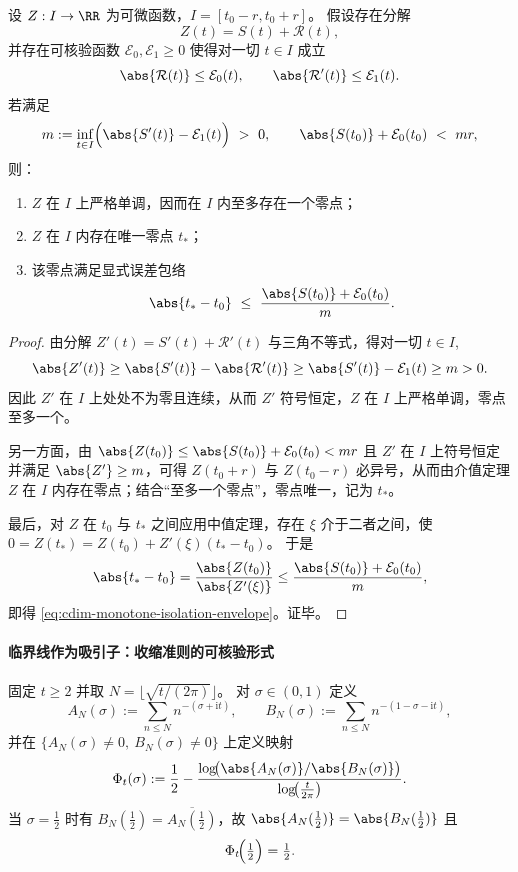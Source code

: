 \begin{theorem}[带余项控制的单调隔离与零点局部唯一性]\label{thm:cdim-monotone-isolation-unique-zero}
设 \(Z:I\to\RR\) 为可微函数，\(I=[t_0-r,t_0+r]\)。
假设存在分解
\[
Z(t)=S(t)+\mathcal{R}(t),
\]
并存在可核验函数 \(\mathcal{E}_0,\mathcal{E}_1\ge 0\) 使得对一切 \(t\in I\) 成立
\[
\abs{\mathcal{R}(t)}\le \mathcal{E}_0(t),
\qquad
\abs{\mathcal{R}'(t)}\le \mathcal{E}_1(t).
\]
若满足
\[
m:=\inf_{t\in I}\Bigl(\abs{S'(t)}-\mathcal{E}_1(t)\Bigr)\ >\ 0,
\qquad
\abs{S(t_0)}+\mathcal{E}_0(t_0)\ <\ mr,
\]
则：
\begin{enumerate}
  \item \(Z\) 在 \(I\) 上严格单调，因而在 \(I\) 内至多存在一个零点；
  \item \(Z\) 在 \(I\) 内存在唯一零点 \(t_\ast\)；
  \item 该零点满足显式误差包络
  \begin{equation}\label{eq:cdim-monotone-isolation-envelope}
  \abs{t_\ast-t_0}\ \le\ \frac{\abs{S(t_0)}+\mathcal{E}_0(t_0)}{m}.
  \end{equation}
\end{enumerate}
\end{theorem}
\begin{proof}
由分解 \(Z'(t)=S'(t)+\mathcal{R}'(t)\) 与三角不等式，得对一切 \(t\in I\),
\[
\abs{Z'(t)}\ge \abs{S'(t)}-\abs{\mathcal{R}'(t)}\ge \abs{S'(t)}-\mathcal{E}_1(t)\ge m>0.
\]
因此 \(Z'\) 在 \(I\) 上处处不为零且连续，从而 \(Z'\) 符号恒定，\(Z\) 在 \(I\) 上严格单调，零点至多一个。
\par
另一方面，由 \(\abs{Z(t_0)}\le \abs{S(t_0)}+\mathcal{E}_0(t_0)<mr\) 且 \(Z'\) 在 \(I\) 上符号恒定并满足 \(\abs{Z'}\ge m\)，可得
\(
Z(t_0+r)
\)
与
\(
Z(t_0-r)
\)
必异号，从而由介值定理 \(Z\) 在 \(I\) 内存在零点；结合“至多一个零点”，零点唯一，记为 \(t_\ast\)。
\par
最后，对 \(Z\) 在 \(t_0\) 与 \(t_\ast\) 之间应用中值定理，存在 \(\xi\) 介于二者之间，使
\(
0=Z(t_\ast)=Z(t_0)+Z'(\xi)(t_\ast-t_0)
\)。
于是
\[
\abs{t_\ast-t_0}=\frac{\abs{Z(t_0)}}{\abs{Z'(\xi)}}
\le \frac{\abs{S(t_0)}+\mathcal{E}_0(t_0)}{m},
\]
即得 \eqref{eq:cdim-monotone-isolation-envelope}。证毕。
\end{proof}

\paragraph{临界线作为吸引子：收缩准则的可核验形式}
固定 \(t\ge 2\) 并取 \(N=\lfloor\sqrt{t/(2\pi)}\rfloor\)。
对 \(\sigma\in(0,1)\) 定义
\[
A_N(\sigma):=\sum_{n\le N}n^{-(\sigma+\mathrm{i}t)},
\qquad
B_N(\sigma):=\sum_{n\le N}n^{-(1-\sigma-\mathrm{i}t)},
\]
并在 \(\{A_N(\sigma)\neq 0,\ B_N(\sigma)\neq 0\}\) 上定义映射
\begin{equation}\label{eq:cdim-afe-Phi-def}
\Phi_t(\sigma):=\frac12-\frac{\log\!\bigl(\abs{A_N(\sigma)}/\abs{B_N(\sigma)}\bigr)}{\log\!\bigl(\tfrac{t}{2\pi}\bigr)}.
\end{equation}
当 \(\sigma=\tfrac12\) 时有 \(B_N(\tfrac12)=\overline{A_N(\tfrac12)}\)，故 \(\abs{A_N(\tfrac12)}=\abs{B_N(\tfrac12)}\) 且
\begin{equation}\label{eq:cdim-afe-Phi-fixedpoint}
\Phi_t\!\Bigl(\tfrac12\Bigr)=\tfrac12.
\end{equation}

